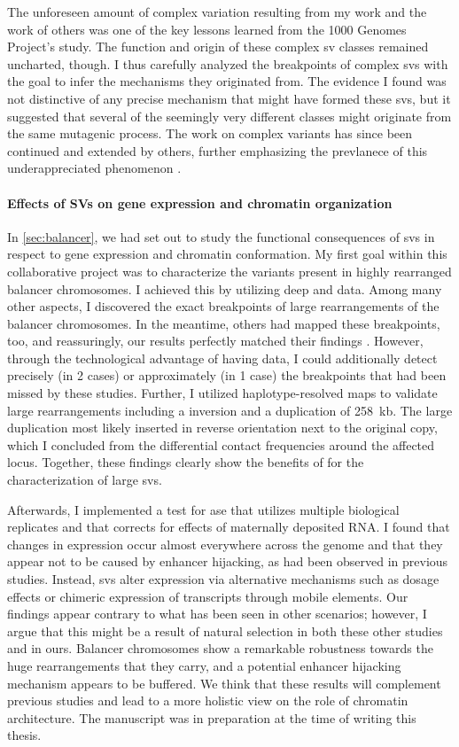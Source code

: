 The unforeseen amount of complex variation resulting from my work and the work
of others was one of the key lessons learned from the 1000 Genomes Project's \sv
study. The function and origin of these complex sv classes remained uncharted,
though. I thus carefully analyzed the breakpoints of complex \acp{sv} with the
goal to infer the mechanisms they originated from. The evidence I found was not
distinctive of any precise mechanism that might have formed these \acp{sv}, but
it suggested that several of the seemingly very different classes might
originate from the same mutagenic process. The work on complex variants has
since been continued and extended by others, further emphasizing the prevlanece
of this underappreciated phenomenon \citep{Collins2017}.


\paragraph{Effects of SVs on gene expression and chromatin organization}
In \cref{sec:balancer}, we had set out to study the functional consequences of
\acp{sv} in respect to gene expression and chromatin conformation. My first goal
within this collaborative project was to characterize the variants present in
highly rearranged balancer chromosomes. I achieved this by utilizing deep \wgs
and \hic data. Among many other aspects, I discovered the exact breakpoints of
large rearrangements of the balancer chromosomes. In the meantime, others had
mapped these breakpoints, too, and reassuringly, our results perfectly matched
their findings \citep{Miller2016,Miller2018}. However, through the technological
advantage of having \hic data, I could additionally detect precisely (in 2
cases) or approximately (in 1 case) the breakpoints that had been missed by
these studies. Further, I utilized haplotype-resolved \hic maps to validate
large rearrangements including a inversion and a duplication of 258~kb. The
large duplication most likely inserted in reverse orientation next to the
original copy, which I concluded from the differential contact frequencies
around the affected locus. Together, these findings clearly show the benefits
of \hic for the characterization of large \acp{sv}.

Afterwards, I implemented a
test for \acl{ase} that utilizes multiple biological replicates and that
corrects for effects of maternally deposited RNA. I found that changes in
expression occur almost everywhere across the genome and that they appear not to
be caused by enhancer hijacking, as had been observed in previous studies.
Instead, \acp{sv} alter expression via alternative mechanisms such as dosage
effects or chimeric expression of transcripts through mobile elements. Our
findings appear contrary to what has been seen in other scenarios; however, I
argue that this might be a result of natural selection in both these other
studies and in ours. Balancer chromosomes show a remarkable robustness towards
the huge rearrangements that they carry, and a potential enhancer hijacking
mechanism appears to be buffered. We think that these results will complement
previous studies and lead to a more holistic view on the role of chromatin
architecture. The manuscript was in preparation at the time of writing this
thesis.


